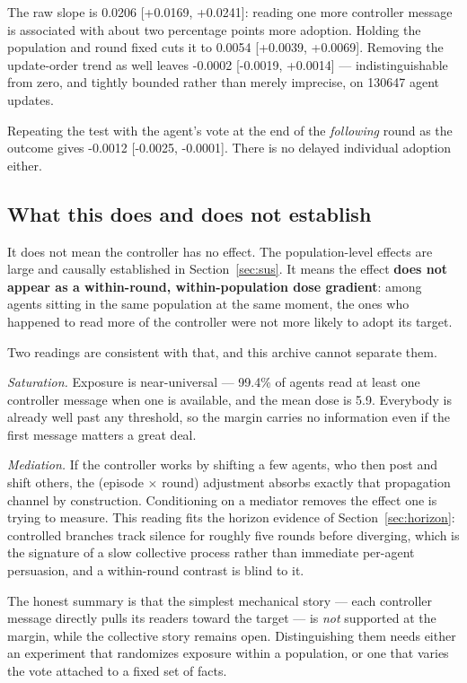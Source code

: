 \documentclass[11pt]{article}
\begin{document}
The raw slope is 0.0206 [+0.0169, +0.0241]: reading one more controller message is
associated with about two percentage points more adoption. Holding the population and round
fixed cuts it to 0.0054 [+0.0039, +0.0069]. Removing the update-order trend as well
leaves -0.0002 [-0.0019, +0.0014] --- indistinguishable from zero, and tightly bounded
rather than merely imprecise, on 130647 agent updates.

Repeating the test with the agent's vote at the end of the \emph{following} round as the
outcome gives -0.0012 [-0.0025, -0.0001]. There is no delayed individual
adoption either.

\subsection{What this does and does not establish}
It does not mean the controller has no effect. The population-level effects are large and
causally established in Section~\ref{sec:sus}. It means the effect \textbf{does not appear as
a within-round, within-population dose gradient}: among agents sitting in the same population
at the same moment, the ones who happened to read more of the controller were not more likely
to adopt its target.

Two readings are consistent with that, and this archive cannot separate them.

\emph{Saturation.} Exposure is near-universal --- 99.4\% of agents read at least one
controller message when one is available, and the mean dose is 5.9. Everybody is
already well past any threshold, so the margin carries no information even if the first
message matters a great deal.

\emph{Mediation.} If the controller works by shifting a few agents, who then post and shift
others, the (episode $\times$ round) adjustment absorbs exactly that propagation channel by
construction. Conditioning on a mediator removes the effect one is trying to measure. This
reading fits the horizon evidence of Section~\ref{sec:horizon}: controlled branches track
silence for roughly five rounds before diverging, which is the signature of a slow collective
process rather than immediate per-agent persuasion, and a within-round contrast is blind to it.

The honest summary is that the simplest mechanical story --- each controller message directly
pulls its readers toward the target --- is \emph{not} supported at the margin, while the
collective story remains open. Distinguishing them needs either an experiment that randomizes
exposure within a population, or one that varies the vote attached to a fixed set of facts.
\end{document}
